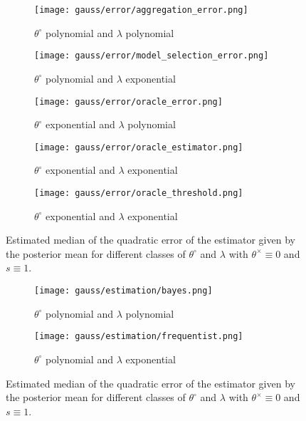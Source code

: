 \begin{figure}
\centering
\begin{subfigure}{.5\textwidth}
  \centering
  \texttt{[image: gauss/error/aggregation\_error.png]}
  \caption{$\theta^{\circ}$ polynomial and $\lambda$ polynomial}
  \label{fig3:sub1}
\end{subfigure}%
\begin{subfigure}{.5\textwidth}
  \centering
  \texttt{[image: gauss/error/model\_selection\_error.png]}
  \caption{$\theta^{\circ}$ polynomial and $\lambda$ exponential}
  \label{fig3:sub2}
\end{subfigure}
\begin{subfigure}{.5\textwidth}
  \centering
  \texttt{[image: gauss/error/oracle\_error.png]}
  \caption{$\theta^{\circ}$ exponential and $\lambda$ polynomial}
  \label{fig3:sub3}
\end{subfigure}%
\begin{subfigure}{.5\textwidth}
  \centering
  \texttt{[image: gauss/error/oracle\_estimator.png]}
  \caption{$\theta^{\circ}$ exponential and $\lambda$ exponential}
  \label{fig3:sub4}
\end{subfigure}
\begin{subfigure}{.5\textwidth}
  \centering
  \texttt{[image: gauss/error/oracle\_threshold.png]}
  \caption{$\theta^{\circ}$ exponential and $\lambda$ exponential}
  \label{fig3:sub4}
\end{subfigure}
\caption{Estimated median of the quadratic error of the estimator given by the posterior mean for different classes of $\theta^{\circ}$ and $\lambda$ with $\theta^{\times} \equiv 0$ and $s \equiv 1$.}
\label{EQM}
\end{figure}


\begin{figure}
\centering
\begin{subfigure}{.5\textwidth}
  \centering
  \texttt{[image: gauss/estimation/bayes.png]}
  \caption{$\theta^{\circ}$ polynomial and $\lambda$ polynomial}
  \label{fig3:sub1}
\end{subfigure}%
\begin{subfigure}{.5\textwidth}
  \centering
  \texttt{[image: gauss/estimation/frequentist.png]}
  \caption{$\theta^{\circ}$ polynomial and $\lambda$ exponential}
  \label{fig3:sub2}
\end{subfigure}
\caption{Estimated median of the quadratic error of the estimator given by the posterior mean for different classes of $\theta^{\circ}$ and $\lambda$ with $\theta^{\times} \equiv 0$ and $s \equiv 1$.}
\label{EQM}
\end{figure}



